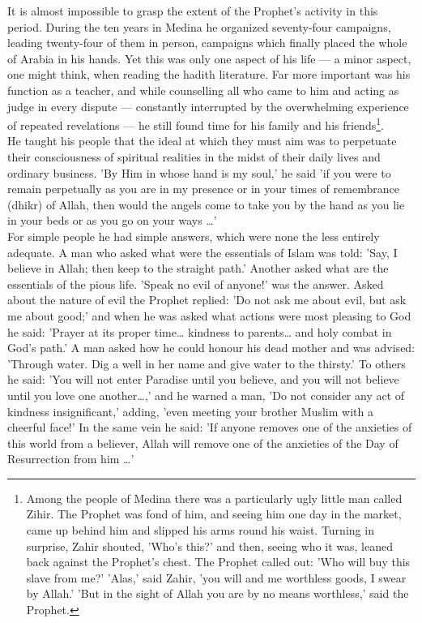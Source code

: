 \documentclass[10pt, twoside]{book}
\begin{document}
It is almost impossible to grasp the extent of the Prophet's activity in this period. During the ten 
years in Medina he organized seventy\hyp{}four campaigns, leading twenty\hyp{}four of them in person, campaigns 
which finally placed the whole of Arabia in his hands. Yet this was only one aspect of his life --- a 
minor aspect, one might think, when reading the hadith literature. Far more important was his 
function as a teacher, and while counselling all who came to him and acting as judge in every dispute 
--- constantly interrupted by the overwhelming experience of repeated revelations --- he still found time 
for his family and his friends\footnote{Among the people of Medina there was a particularly ugly little man called Zihir. The Prophet was fond of him, and seeing him one day in the market, came up behind him and slipped his arms round his waist. Turning in surprise, Zahir shouted, 'Who's this?' and then, seeing who it was, leaned back against the Prophet's chest. The Prophet called out: 'Who will buy this slave from me?' 'Alas,' said Zahir, 'you will and me worthless goods, I swear by Allah.' 'But in the sight of Allah you are by no means worthless,' said the Prophet.}. \\

He taught his people that the ideal at which they must aim was to perpetuate their consciousness of 
spiritual realities in the midst of their daily lives and ordinary business. 'By Him in whose hand is 
my soul,' he said 'if you were to remain perpetually as you are in my presence or in your times of 
remembrance (dhikr) of Allah, then would the angels come to take you by the hand as you lie in your 
beds or as you go on your ways \ldots{}' \\

For simple people he had simple answers, which were none the less entirely adequate. A man who asked 
what were the essentials of Islam was told: 'Say, I believe in Allah; then keep to the straight 
path.' Another asked what are the essentials of the pious life. 'Speak no evil of anyone!' was the 
answer. Asked about the nature of evil the Prophet replied: 'Do not ask me about evil, but ask me 
about good;' and when he was asked what actions were most pleasing to God he said: 'Prayer at its 
proper time\ldots{} kindness to parents\ldots{} and holy combat in God's path.' A man asked how he could honour his dead mother and was advised: 'Through water. Dig a well in her name and give water to the thirsty.' To others he said: 'You will not enter Paradise until you believe, and you will not believe 
until you love one another\ldots{},' and he warned a man, 'Do not consider any act of kindness 
insignificant,' adding, 'even meeting your brother Muslim with a cheerful face!' In the same vein he 
said: 'If anyone removes one of the anxieties of this world from a believer, Allah will remove one of 
the anxieties of the Day of Resurrection from him \ldots{}' \\
\end{document}
